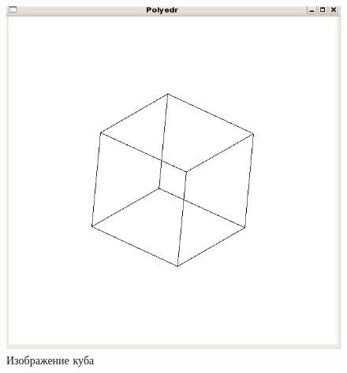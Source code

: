 \begin{figure}[ht!]
\begin{center}
\includegraphics[scale=0.4]{images/4}
\end{center}
\vspace*{-8mm}
\caption{Изображение куба}\label{fig:pic_2}
\end{figure}


